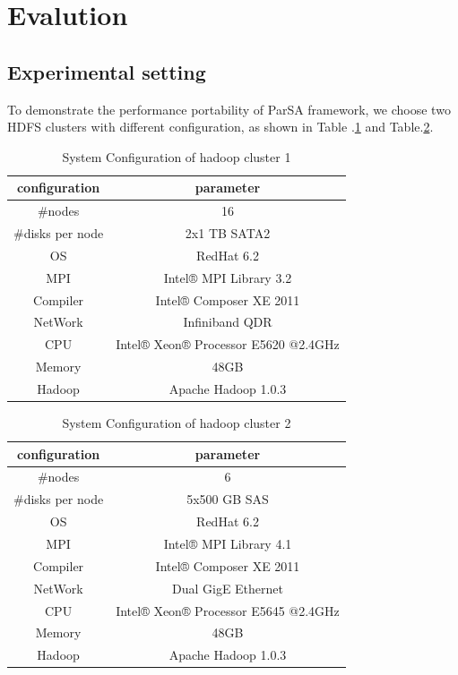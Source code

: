 \documentclass[preprint,12pt]{elsarticle}
\begin{document}
\section{Evalution}

\subsection{Experimental setting}
To demonstrate the performance portability of ParSA framework, we choose two HDFS clusters with different configuration, as shown in Table
.\ref{table1} and Table.\ref{table2}. \par

\begin{table}[ht]
\caption{System Configuration of hadoop cluster 1} 
\centering 
\begin{tabular}{c c}
\hline
configuration & parameter \\
\hline 
\#nodes & 16 \\ 
\#disks per node & 2x1 TB SATA2 \\
OS & RedHat 6.2 \\
MPI & Intel® MPI Library 3.2 \\
Compiler & Intel® Composer XE 2011 \\
NetWork & Infiniband QDR \\
CPU & Intel® Xeon® Processor E5620 @2.4GHz \\
Memory & 48GB \\
Hadoop & Apache Hadoop 1.0.3 \\
\hline 
\end{tabular}
\label{table1} 
\end{table}

\begin{table}[ht]
\caption{System Configuration of hadoop cluster 2} 
\centering 
\begin{tabular}{c c}
\hline
configuration & parameter \\
\hline 
\#nodes & 6 \\ 
\#disks per node & 5x500 GB SAS \\
OS & RedHat 6.2 \\
MPI & Intel® MPI Library 4.1 \\
Compiler & Intel® Composer XE 2011 \\
NetWork & Dual GigE Ethernet \\
CPU & Intel® Xeon® Processor E5645 @2.4GHz \\
Memory & 48GB \\
Hadoop & Apache Hadoop 1.0.3 \\
\hline 
\end{tabular}
\label{table2} 
\end{table}
\end{document}
